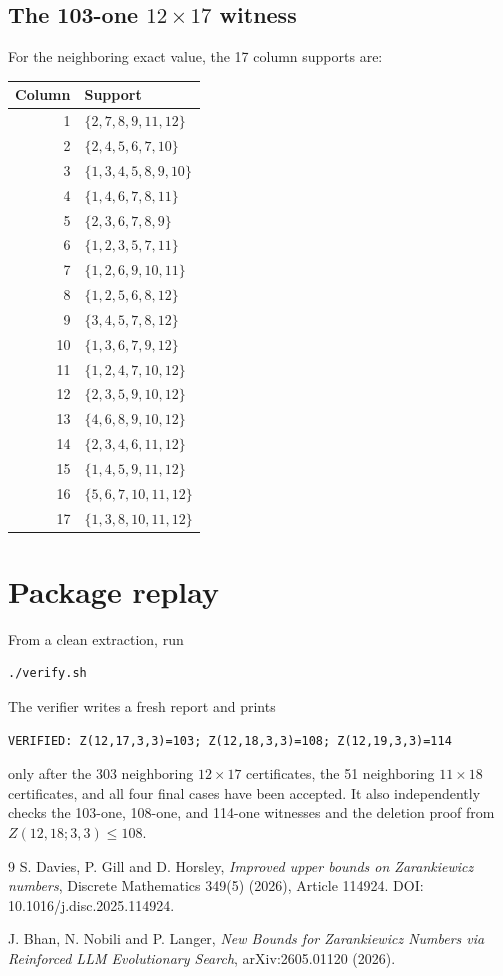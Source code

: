 \documentclass[11pt]{article}
\begin{document}
\subsection{The 103-one $12\times17$ witness}
For the neighboring exact value, the 17 column supports are:

\begin{longtable}{r l}
\toprule
Column & Support \\
\midrule
\endhead
1 & $\{2,7,8,9,11,12\}$ \\
2 & $\{2,4,5,6,7,10\}$ \\
3 & $\{1,3,4,5,8,9,10\}$ \\
4 & $\{1,4,6,7,8,11\}$ \\
5 & $\{2,3,6,7,8,9\}$ \\
6 & $\{1,2,3,5,7,11\}$ \\
7 & $\{1,2,6,9,10,11\}$ \\
8 & $\{1,2,5,6,8,12\}$ \\
9 & $\{3,4,5,7,8,12\}$ \\
10 & $\{1,3,6,7,9,12\}$ \\
11 & $\{1,2,4,7,10,12\}$ \\
12 & $\{2,3,5,9,10,12\}$ \\
13 & $\{4,6,8,9,10,12\}$ \\
14 & $\{2,3,4,6,11,12\}$ \\
15 & $\{1,4,5,9,11,12\}$ \\
16 & $\{5,6,7,10,11,12\}$ \\
17 & $\{1,3,8,10,11,12\}$ \\
\bottomrule
\end{longtable}

\section{Package replay}
From a clean extraction, run
\begin{verbatim}
./verify.sh
\end{verbatim}
The verifier writes a fresh report and prints
\begin{verbatim}
VERIFIED: Z(12,17,3,3)=103; Z(12,18,3,3)=108; Z(12,19,3,3)=114
\end{verbatim}
only after the 303 neighboring $12\times17$ certificates, the 51 neighboring
$11\times18$ certificates, and all four final cases have been accepted. It
also independently checks the 103-one, 108-one, and 114-one witnesses and the
deletion proof from $Z(12,18;3,3)\le108$.

\begin{thebibliography}{9}
S. Davies, P. Gill and D. Horsley,
\emph{Improved upper bounds on Zarankiewicz numbers},
Discrete Mathematics 349(5) (2026), Article 114924.
DOI: 10.1016/j.disc.2025.114924.

J. Bhan, N. Nobili and P. Langer,
\emph{New Bounds for Zarankiewicz Numbers via Reinforced LLM Evolutionary Search},
arXiv:2605.01120 (2026).
\end{thebibliography}
\end{document}
